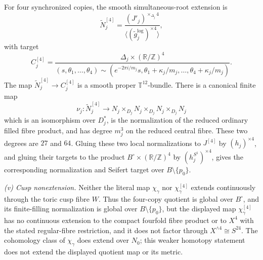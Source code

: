 \begin{theorem}
For four synchronized copies, the smooth simultaneous-root extension is
\begin{equation}
 \widetilde N_j^{[4]}
 =\frac{(J'_j)^{\times_{\Delta_j}4}}
 {\langle(\widetilde g_j^{\log})^{\times4}\rangle},
 \label{cusp-spec-finite-fourfold-normalization}
\end{equation}
with target
\begin{equation}
 C_j^{[4]}=
 \frac{\Delta_j\times(\mathbb R/\mathbb Z)^4}
 {(s,\theta_1,\ldots,\theta_4)\sim
  (e^{-2\pi i/m_j}s,
   \theta_1+\kappa_j/m_j,\ldots,\theta_4+\kappa_j/m_j)}.
 \label{cusp-spec-finite-fourfold-target}
\end{equation}
The map \(\widetilde N_j^{[4]}\to C_j^{[4]}\) is a smooth proper
\(\mathbb T^{12}\)-bundle.  There is a canonical finite map
\begin{equation}
 \nu_j:\widetilde N_j^{[4]}
 \longrightarrow N_j\times_{D_j}N_j\times_{D_j}N_j\times_{D_j}N_j
 \label{cusp-spec-finite-normalization-map}
\end{equation}
which is an isomorphism over \(D_j^*\), is the normalization of the
reduced ordinary filled fibre product, and has degree \(m_j^3\) on the
reduced central fibre.  These two degrees are \(27\) and \(64\).  Gluing
these two local normalizations to \(J^{[4]}\) by
\((h_j)^{\times4}\), and gluing their targets to the product
\(B^\circ\times(\mathbb R/\mathbb Z)^4\) by
\((h_j^{S^1})^{\times4}\), gives the corresponding normalization and
Seifert target over \(B\setminus\{p_0\}\).

\smallskip
\noindent
\emph{(v) Cusp nonextension.}
Neither the literal map \(\chi_\gamma\) nor
\(\chi_\gamma^{[4]}\) extends continuously through the toric cusp fibre
\(W\).  Thus the four-copy quotient is global over \(B^\circ\), and its
finite-filling normalization is global over \(B\setminus\{p_0\}\), but
the displayed map \(\chi_\gamma^{[4]}\) has no continuous extension to
the compact fourfold fibre product or to \(X^4\) with the stated
regular-fibre restriction, and it does not factor through
\(X^{\wedge4}\cong S^{24}\).  The cohomology class of
\(\chi_\gamma\) does extend over
\(N_0\); this weaker homotopy statement does not extend the displayed
quotient map or its metric.


\end{theorem}
